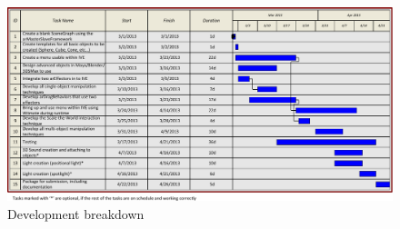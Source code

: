 \begin{landscape}
	\begin{figure}[htbp]
		\includegraphics{figs/gantt_chart.pdf}
		\caption{Development breakdown}
		\label{fig:gantt}
	\end{figure}
\end{landscape}

